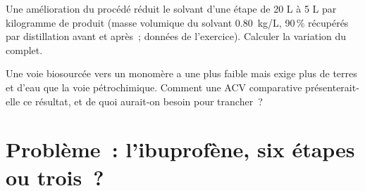 \begin{exercise}[$\star\star\star$]\label{exo:b3:green-industrial:11}
Une amélioration du procédé réduit le solvant d'une étape de 20 L à 5 L par
kilogramme de produit (masse volumique du solvant \qty{0.80}{kg/L}, 90\,\% récupérés par distillation avant et après~; données
de l'exercice). Calculer la variation du  complet.
\end{exercise}

\begin{exercise}[$\star\star\star$]\label{exo:b3:green-industrial:12}
Une voie biosourcée vers un monomère a une  plus faible
mais exige plus de terres et d'eau que la voie pétrochimique. Comment une
ACV comparative présenterait-elle ce résultat, et de quoi aurait-on besoin
pour trancher~?
\end{exercise}

\section{Problème~: l'ibuprofène, six étapes ou trois~?}

